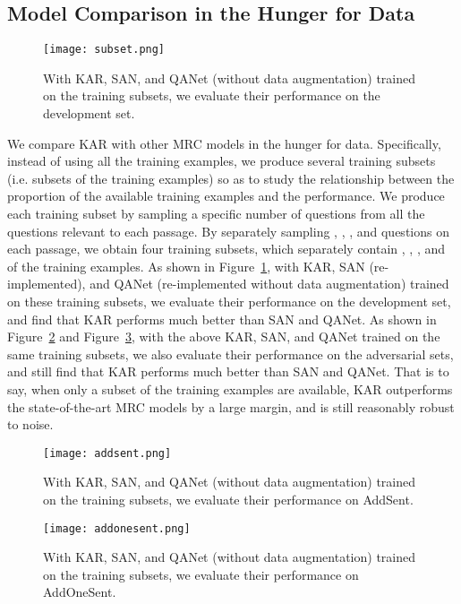 \documentclass[11pt,a4paper]{article}
\begin{document}
\subsection{Model Comparison in the Hunger for Data}
\begin{figure}
\centering
\texttt{[image: subset.png]}
\caption{\label{f2} With KAR, SAN, and QANet (without data augmentation) trained on the training subsets, we evaluate their performance on the development set.}
\end{figure}
We compare KAR with other MRC models in the hunger for data. Specifically, instead of using all the training examples, we produce several training subsets (i.e. subsets of the training examples) so as to study the relationship between the proportion of the available training examples and the performance. We produce each training subset by sampling a specific number of questions from all the questions relevant to each passage. By separately sampling , , , and  questions on each passage, we obtain four training subsets, which separately contain , , , and  of the training examples. As shown in Figure~\ref{f2}, with KAR, SAN (re-implemented), and QANet (re-implemented without data augmentation) trained on these training subsets, we evaluate their performance on the development set, and find that KAR performs much better than SAN and QANet. As shown in Figure~\ref{f3} and Figure~\ref{f4}, with the above KAR, SAN, and QANet trained on the same training subsets, we also evaluate their performance on the adversarial sets, and still find that KAR performs much better than SAN and QANet. That is to say, when only a subset of the training examples are available, KAR outperforms the state-of-the-art MRC models by a large margin, and is still reasonably robust to noise.
\begin{figure}
\centering
\texttt{[image: addsent.png]}
\caption{\label{f3} With KAR, SAN, and QANet (without data augmentation) trained on the training subsets, we evaluate their performance on AddSent.}
\end{figure}
\begin{figure}
\centering
\texttt{[image: addonesent.png]}
\caption{\label{f4} With KAR, SAN, and QANet (without data augmentation) trained on the training subsets, we evaluate their performance on AddOneSent.}
\end{figure}
\end{document}
